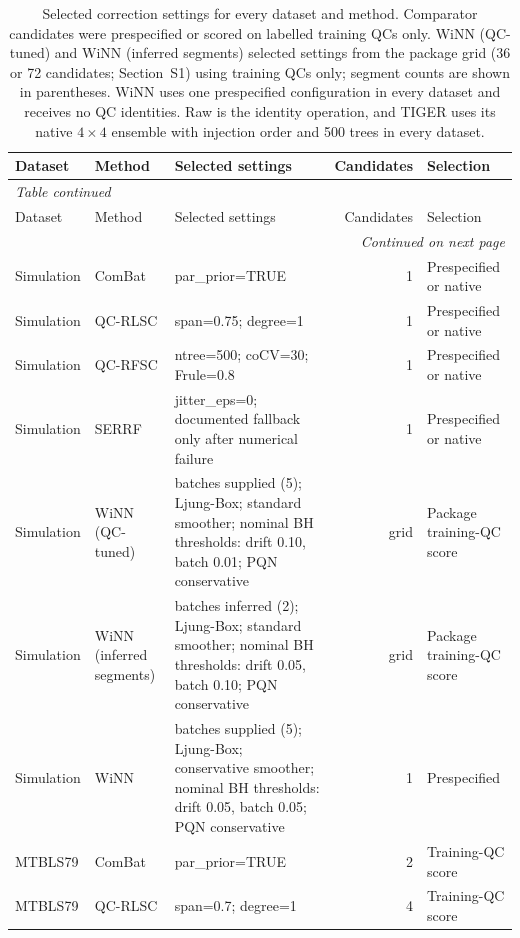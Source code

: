\begin{landscape}
\scriptsize
\begin{longtable}{p{2.6cm}p{3.4cm}p{9.6cm}rp{3.6cm}}
\caption{Selected correction settings for every dataset and method. Comparator candidates were prespecified or scored on labelled training QCs only. WiNN (QC-tuned) and WiNN (inferred segments) selected settings from the package grid (36 or 72 candidates; Section~S1) using training QCs only; segment counts are shown in parentheses. WiNN uses one prespecified configuration in every dataset and receives no QC identities. Raw is the identity operation, and TIGER uses its native $4\times4$ ensemble with injection order and 500 trees in every dataset.}\label{tab:supp_selected_parameters}\\
\toprule
Dataset & Method & Selected settings & Candidates & Selection \\
\midrule
\endfirsthead
\multicolumn{5}{l}{\textit{Table \thetable{} continued}}\\
\toprule
Dataset & Method & Selected settings & Candidates & Selection \\
\midrule
\endhead
\midrule
\multicolumn{5}{r}{\textit{Continued on next page}}\\
\endfoot
\bottomrule
\endlastfoot
Simulation & ComBat & par\_prior=TRUE & 1 & Prespecified or native \\
Simulation & QC-RLSC & span=0.75; degree=1 & 1 & Prespecified or native \\
Simulation & QC-RFSC & ntree=500; coCV=30; Frule=0.8 & 1 & Prespecified or native \\
Simulation & SERRF & jitter\_eps=0; documented fallback only after numerical failure & 1 & Prespecified or native \\
Simulation & WiNN (QC-tuned) & batches supplied (5); Ljung-Box; standard smoother; nominal BH thresholds: drift 0.10, batch 0.01; PQN conservative & grid & Package training-QC score \\
Simulation & WiNN (inferred segments) & batches inferred (2); Ljung-Box; standard smoother; nominal BH thresholds: drift 0.05, batch 0.10; PQN conservative & grid & Package training-QC score \\
Simulation & WiNN & batches supplied (5); Ljung-Box; conservative smoother; nominal BH thresholds: drift 0.05, batch 0.05; PQN conservative & 1 & Prespecified \\
\midrule
MTBLS79 & ComBat & par\_prior=TRUE & 2 & Training-QC score \\
MTBLS79 & QC-RLSC & span=0.7; degree=1 & 4 & Training-QC score \\

\end{longtable}
\end{landscape}
